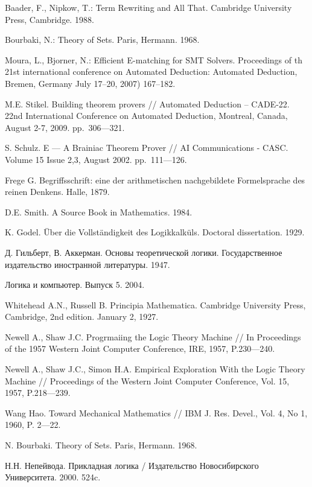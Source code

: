 \begin{thebibliography}{99}
 Baader, F., Nipkow, T.: Term Rewriting and All That. Cambridge University Press, Cambridge. 1988.

 Bourbaki, N.: Theory of Sets. Paris, Hermann. 1968.

 Moura, L., Bjorner, N.: Efficient E-matching for SMT Solvers. Proceedings of th 21st international conference on Automated Deduction: Automated Deduction, Bremen, Germany July 17--20, 2007) 167--182.

 M.E. Stikel. Building theorem provers // Automated Deduction – CADE-22. 22nd International Conference on Automated Deduction, Montreal, Canada, August 2-7, 2009. pp.~306---321.

 S. Schulz. E --- A Brainiac Theorem Prover // AI Communications - CASC. Volume 15 Issue 2,3, August 2002. pp.~111---126.

 Frege G. Begriffsschrift: eine der arithmetischen nachgebildete Formelsprache des reinen Denkens. Halle, 1879.

 D.E. Smith. A Source Book in Mathematics. 1984.

 K. Godel. Über die Vollständigkeit des Logikkalküls. Doctoral dissertation. 1929.

 Д. Гильберт, В. Аккерман. Основы теоретической логики. Государственное издательство иностранной литературы. 1947.

 Логика и компьютер. Выпуск 5. 2004.

 Whitehead A.N., Russell B. Principia Mathematica. Cambridge University Press, Cambridge, 2nd edition. January 2, 1927.

 Newell A., Shaw J.C. Progrmaiing the Logic Theory Machine // In Proceedings of the 1957 Western Joint Computer Conference, IRE, 1957, P.230---240.

 Newell A., Shaw J.C., Simon H.A. Empirical Exploration With the Logic Theory Machine // Proceedings of the Western Joint Computer Conference, Vol. 15, 1957, P.218---239.

 Wang Hao. Toward Mechanical Mathematics // IBM J. Res. Devel., Vol. 4, No 1, 1960, P. 2---22.

 N. Bourbaki. Theory of Sets. Paris, Hermann. 1968.

 Н.Н. Непейвода. Прикладная логика / Издательство Новосибирского Университета. 2000. 524c.


\end{thebibliography}
